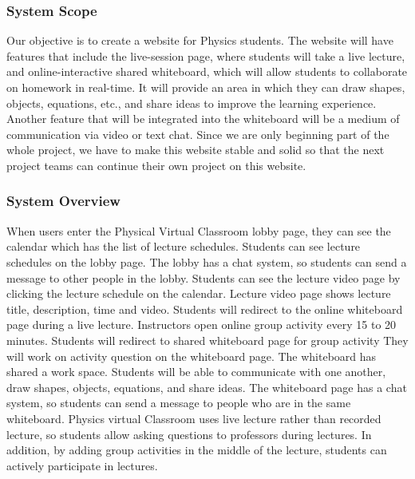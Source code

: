 \documentclass[10pt]{article}
\begin{document}
        \subsubsection{System Scope}
            Our objective is to create a website for Physics students. The website will have features that include the live-session page, where students will take a live lecture, and online-interactive shared whiteboard, which will allow students to collaborate on homework in real-time. It will provide an area in which they can draw shapes, objects, equations, etc., and share ideas to improve the learning experience. Another feature that will be integrated into the whiteboard will be a medium of communication via video or text chat. Since we are only beginning part of the whole project, we have to make this website stable and solid so that the next project teams can continue their own project on this website.

        \subsubsection{System Overview}
            When users enter the Physical Virtual Classroom lobby page, they can see the calendar which has the list of lecture schedules. Students can see lecture schedules on the lobby page. The lobby has a chat system, so students can send a message to other people in the lobby. Students can see the lecture video page by clicking the lecture schedule on the calendar. Lecture video page shows lecture title, description, time and video. Students will redirect to the online whiteboard page during a live lecture. Instructors open online group activity every 15 to 20 minutes. Students will redirect to shared whiteboard page for group activity They will work on activity question on the whiteboard page. The whiteboard has shared a work space. Students will be able to communicate with one another, draw shapes, objects, equations, and share ideas. The whiteboard page has a chat system, so students can send a message to people who are in the same whiteboard. Physics virtual Classroom uses live lecture rather than recorded lecture, so students allow asking questions to professors during lectures. In addition, by adding group activities in the middle of the lecture, students can actively participate in lectures.
\end{document}
